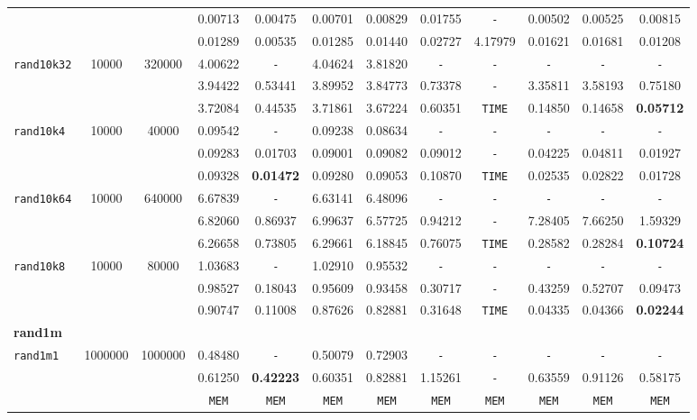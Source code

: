 \begin{table}
{\begin{tabular}{ l c c | c c c c c c c c c }
 &  &  & 0.00713 & 0.00475 & 0.00701 & 0.00829 & 0.01755 & \verb|-| & 0.00502 & 0.00525 & 0.00815 \\
 &  &  & 0.01289 & 0.00535 & 0.01285 & 0.01440 & 0.02727 & 4.17979 & 0.01621 & 0.01681 & 0.01208 \\
\hline
\verb|rand10k32| & 10000 & 320000 & 4.00622 & \verb|-| & 4.04624 & 3.81820 & \verb|-| & \verb|-| & \verb|-| & \verb|-| & \verb|-| \\
 &  &  & 3.94422 & 0.53441 & 3.89952 & 3.84773 & 0.73378 & \verb|-| & 3.35811 & 3.58193 & 0.75180 \\
 &  &  & 3.72084 & 0.44535 & 3.71861 & 3.67224 & 0.60351 & \verb|TIME| & 0.14850 & 0.14658 & \textbf{0.05712} \\
\hline
\verb|rand10k4| & 10000 & 40000 & 0.09542 & \verb|-| & 0.09238 & 0.08634 & \verb|-| & \verb|-| & \verb|-| & \verb|-| & \verb|-| \\
 &  &  & 0.09283 & 0.01703 & 0.09001 & 0.09082 & 0.09012 & \verb|-| & 0.04225 & 0.04811 & 0.01927 \\
 &  &  & 0.09328 & \textbf{0.01472} & 0.09280 & 0.09053 & 0.10870 & \verb|TIME| & 0.02535 & 0.02822 & 0.01728 \\
\hline
\verb|rand10k64| & 10000 & 640000 & 6.67839 & \verb|-| & 6.63141 & 6.48096 & \verb|-| & \verb|-| & \verb|-| & \verb|-| & \verb|-| \\
 &  &  & 6.82060 & 0.86937 & 6.99637 & 6.57725 & 0.94212 & \verb|-| & 7.28405 & 7.66250 & 1.59329 \\
 &  &  & 6.26658 & 0.73805 & 6.29661 & 6.18845 & 0.76075 & \verb|TIME| & 0.28582 & 0.28284 & \textbf{0.10724} \\
\hline
\verb|rand10k8| & 10000 & 80000 & 1.03683 & \verb|-| & 1.02910 & 0.95532 & \verb|-| & \verb|-| & \verb|-| & \verb|-| & \verb|-| \\
 &  &  & 0.98527 & 0.18043 & 0.95609 & 0.93458 & 0.30717 & \verb|-| & 0.43259 & 0.52707 & 0.09473 \\
 &  &  & 0.90747 & 0.11008 & 0.87626 & 0.82881 & 0.31648 & \verb|TIME| & 0.04335 & 0.04366 & \textbf{0.02244} \\
\hline
\multicolumn{12}{l}{\textbf{rand1m}} \\
\hline
\verb|rand1m1| & 1000000 & 1000000 & 0.48480 & \verb|-| & 0.50079 & 0.72903 & \verb|-| & \verb|-| & \verb|-| & \verb|-| & \verb|-| \\
 &  &  & 0.61250 & \textbf{0.42223} & 0.60351 & 0.82881 & 1.15261 & \verb|-| & 0.63559 & 0.91126 & 0.58175 \\
 &  &  & \verb|MEM| & \verb|MEM| & \verb|MEM| & \verb|MEM| & \verb|MEM| & \verb|MEM| & \verb|MEM| & \verb|MEM| & \verb|MEM| \\

\end{tabular}}
\end{table}
